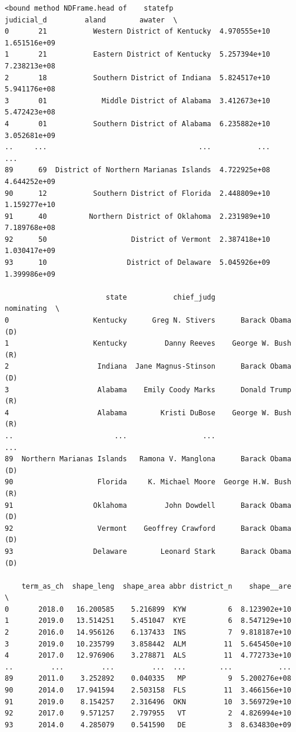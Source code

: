\documentclass[
  letterpaper,
  DIV=11,
  numbers=noendperiod]{scrartcl}
\begin{document}
\begin{verbatim}
<bound method NDFrame.head of    statefp                             judicial_d         aland        awater  \
0       21           Western District of Kentucky  4.970555e+10  1.651516e+09   
1       21           Eastern District of Kentucky  5.257394e+10  7.238213e+08   
2       18           Southern District of Indiana  5.824517e+10  5.941176e+08   
3       01             Middle District of Alabama  3.412673e+10  5.472423e+08   
4       01           Southern District of Alabama  6.235882e+10  3.052681e+09   
..     ...                                    ...           ...           ...   
89      69  District of Northern Marianas Islands  4.722925e+08  4.644252e+09   
90      12           Southern District of Florida  2.448809e+10  1.159277e+10   
91      40          Northern District of Oklahoma  2.231989e+10  7.189768e+08   
92      50                    District of Vermont  2.387418e+10  1.030417e+09   
93      10                   District of Delaware  5.045926e+09  1.399986e+09   

                        state           chief_judg            nominating  \
0                    Kentucky      Greg N. Stivers      Barack Obama (D)   
1                    Kentucky         Danny Reeves    George W. Bush (R)   
2                     Indiana  Jane Magnus-Stinson      Barack Obama (D)   
3                     Alabama    Emily Coody Marks      Donald Trump (R)   
4                     Alabama        Kristi DuBose    George W. Bush (R)   
..                        ...                  ...                   ...   
89  Northern Marianas Islands   Ramona V. Manglona      Barack Obama (D)   
90                    Florida     K. Michael Moore  George H.W. Bush (R)   
91                   Oklahoma         John Dowdell      Barack Obama (D)   
92                    Vermont    Geoffrey Crawford      Barack Obama (D)   
93                   Delaware        Leonard Stark      Barack Obama (D)   

    term_as_ch  shape_leng  shape_area abbr district_n    shape__are  \
0       2018.0   16.200585    5.216899  KYW          6  8.123902e+10   
1       2019.0   13.514251    5.451047  KYE          6  8.547129e+10   
2       2016.0   14.956126    6.137433  INS          7  9.818187e+10   
3       2019.0   10.235799    3.858442  ALM         11  5.645450e+10   
4       2017.0   12.976906    3.278871  ALS         11  4.772733e+10   
..         ...         ...         ...  ...        ...           ...   
89      2011.0    3.252892    0.040335   MP          9  5.200276e+08   
90      2014.0   17.941594    2.503158  FLS         11  3.466156e+10   
91      2019.0    8.154257    2.316496  OKN         10  3.569729e+10   
92      2017.0    9.571257    2.797955   VT          2  4.826994e+10   
93      2014.0    4.285079    0.541590   DE          3  8.634830e+09   


\end{verbatim}
\end{document}
